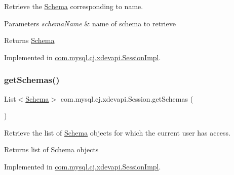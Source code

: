 Retrieve the \mbox{\hyperlink{interfacecom_1_1mysql_1_1cj_1_1xdevapi_1_1_schema}{Schema}} corresponding to name.


\begin{DoxyParams}{Parameters}
{\em schema\+Name} & name of schema to retrieve \\
\hline
\end{DoxyParams}
\begin{DoxyReturn}{Returns}
\mbox{\hyperlink{interfacecom_1_1mysql_1_1cj_1_1xdevapi_1_1_schema}{Schema}} 
\end{DoxyReturn}


Implemented in \mbox{\hyperlink{classcom_1_1mysql_1_1cj_1_1xdevapi_1_1_session_impl_aeb00f17f0c469af51f790c4a73666904}{com.\+mysql.\+cj.\+xdevapi.\+Session\+Impl}}.

\mbox{\label{interfacecom_1_1mysql_1_1cj_1_1xdevapi_1_1_session_ac2c871a98ae18a178d73e76c89655ed3}} 
\subsubsection{\texorpdfstring{get\+Schemas()}{getSchemas()}}
{\footnotesize\ttfamily List$<$\mbox{\hyperlink{interfacecom_1_1mysql_1_1cj_1_1xdevapi_1_1_schema}{Schema}}$>$ com.\+mysql.\+cj.\+xdevapi.\+Session.\+get\+Schemas (\begin{DoxyParamCaption}{ }\end{DoxyParamCaption})}

Retrieve the list of \mbox{\hyperlink{interfacecom_1_1mysql_1_1cj_1_1xdevapi_1_1_schema}{Schema}} objects for which the current user has access.

\begin{DoxyReturn}{Returns}
list of \mbox{\hyperlink{interfacecom_1_1mysql_1_1cj_1_1xdevapi_1_1_schema}{Schema}} objects 
\end{DoxyReturn}


Implemented in \mbox{\hyperlink{classcom_1_1mysql_1_1cj_1_1xdevapi_1_1_session_impl_a2d607f33ef3231038642b5836b813531}{com.\+mysql.\+cj.\+xdevapi.\+Session\+Impl}}.

\mbox{\label{interfacecom_1_1mysql_1_1cj_1_1xdevapi_1_1_session_a8c5c670815d5fab8edb586c4a4e684ac}} 
